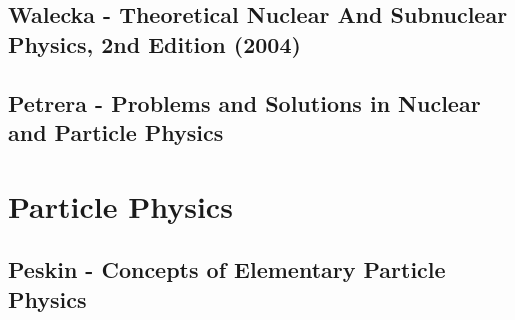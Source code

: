 \documentclass[10pt,a4paper]{book}
\theoremstyle{definition}
\begin{document}
\section{{\sc Walecka} - Theoretical Nuclear And Subnuclear Physics, 2nd Edition (2004)}

\section{{\sc Petrera} - Problems and Solutions in Nuclear and Particle Physics}

\chapter{Particle Physics}

\section{{\sc Peskin} - Concepts of Elementary Particle Physics}
\end{document}
